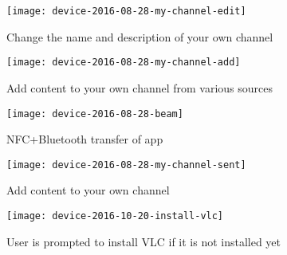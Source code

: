\begin{figure}[h]
\centering
\texttt{[image: device-2016-08-28-my-channel-edit]}
\caption{Change the name and description of your own channel}
\label{fig:my-channel-edit}
\end{figure}

\begin{figure}[h]
	\centering
	\texttt{[image: device-2016-08-28-my-channel-add]}
	\caption{Add content to your own channel from various sources}
	\label{fig:my-channel-add}
\end{figure}

\begin{figure}[h]
	\centering
	\texttt{[image: device-2016-08-28-beam]}
	\caption{NFC+Bluetooth transfer of app}
	\label{fig:beam}
\end{figure}

\begin{figure}[h]
\centering
\texttt{[image: device-2016-08-28-my-channel-sent]}
\caption{Add content to your own channel}
\label{fig:my-channel-sent}
\end{figure}

\begin{figure}[h]
	\centering
	\texttt{[image: device-2016-10-20-install-vlc]}
	\caption{User is prompted to install VLC if it is not installed yet}
	\label{fig:install-vlc}
\end{figure}

